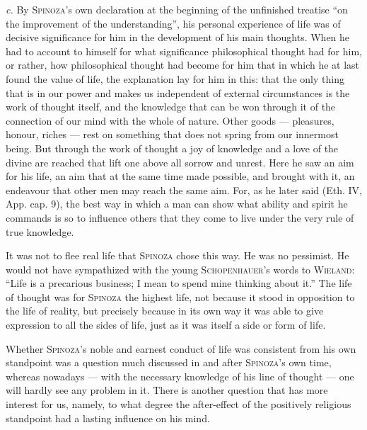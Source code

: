 \documentclass[12pt]{article}
\newcommand{\opage}[1]{\marginnote{\footnotesize\textit{[#1]}}}
\begin{document}
\opage{12}\textit{c.} By \textsc{Spinoza}'s own declaration at the beginning of
the unfinished treatise ``on the improvement of the understanding'', his personal
experience of life was of decisive significance for him in the development of his
main thoughts. When he had to account to himself for what significance
philosophical thought had for him, or rather, how philosophical thought had become
for him that in which he at last found the value of life, the explanation lay for
him in this: that the only thing that is in our power and makes us independent of
external circumstances is the work of thought itself, and the knowledge that can be
won through it of the connection of our mind with the whole of nature.
Other goods --- pleasures, honour, riches --- rest on something that does not spring
from our innermost being. But through the work of thought a joy of knowledge and a
love of the divine are reached that lift one above all sorrow and unrest. Here he
saw an aim for his life, an aim that at the same time made possible, and brought
with it, an endeavour that other men may reach the same aim. For, as he later said
(Eth. IV, App. cap. 9), the best way in which a man can show what ability and
spirit he commands is so to influence others that they come to live under the very
rule of true knowledge.

It was not to flee real life that \textsc{Spinoza} chose this way. He was no
pessimist. He would not have sympathized with the young \textsc{Schopenhauer}'s
words to \textsc{Wieland}: ``Life is a precarious business; I mean to spend mine
thinking about it.'' The life of thought was for \textsc{Spinoza} the highest life,
not because it stood in opposition to the life of reality, but precisely because in
its own way it was able to give expression to all the sides of life, just as it was
itself a side or form of life.

Whether \textsc{Spinoza}'s noble and earnest conduct of life was consistent from his
own standpoint was a question much discussed in and after \textsc{Spinoza}'s own
time, whereas nowadays --- with the necessary knowledge of his line of thought ---
one will hardly see any problem in it. There is another question that has more
interest for us, namely, to what degree the after-effect of the positively religious
standpoint had a lasting influence on his mind.
\end{document}
